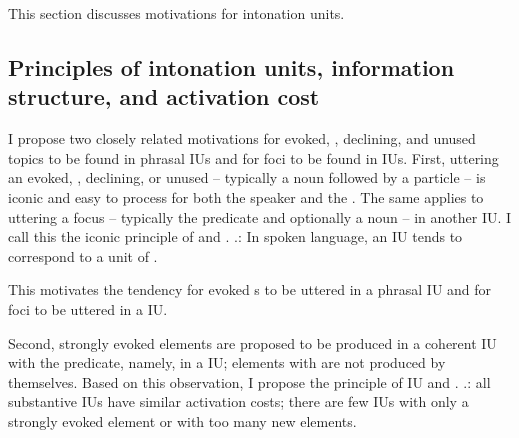 This section discusses motivations for intonation units.

\subsection{Principles of intonation units, information structure, and activation cost}

I propose two closely related motivations for evoked, , declining, and unused topics to be found in phrasal IUs and for foci to be found in  IUs.
First,
uttering an evoked, , declining, or unused  -- typically a noun followed by a  particle -- is iconic and easy to process for both the speaker and the . The same applies to uttering a focus -- typically the predicate and optionally a noun -- in another IU. 
I call this the iconic principle of  and  \Next.
%
\ex.\label{IUIconicP}:
	In spoken language,
	an IU tends to correspond to a unit of .

This motivates the tendency for
evoked s to be uttered in a phrasal IU and for foci to be uttered in a  IU.

Second,
strongly evoked elements are proposed to be produced in a coherent IU with the predicate,
namely, in a  IU;
elements with  are not produced by themselves.
Based on this observation,
I propose the principle of IU and .
%
\ex.\label{IUActCostP}:
     all substantive IUs have similar activation costs;
     there are few IUs with only a strongly evoked element or
     with too many new elements.

